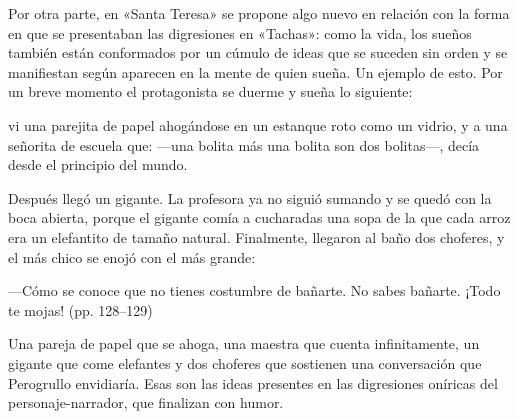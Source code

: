 \documentclass[14pt,twoside,final]{extbook} %
\begin{document}
Por otra parte, en «Santa Teresa» se propone algo nuevo en relación con la forma en que se presentaban las digresiones en «Tachas»: como la vida, los sueños también están conformados por un cúmulo de ideas que se suceden sin orden y se manifiestan según aparecen en la mente de quien sueña. Un ejemplo de esto. Por un breve momento el protagonista se duerme y sueña lo siguiente:
\begin{quoting}
vi una parejita de papel ahogándose en un estanque roto como un vidrio, y a una señorita de escuela que: ---una bolita más una bolita son dos bolitas---, decía desde el principio del mundo.

Después llegó un gigante. La profesora ya no siguió sumando y se quedó con la boca abierta, porque el gigante comía a cucharadas una sopa de la que cada arroz era un elefantito de tamaño natural. Finalmente, llegaron al baño dos choferes, y el más chico se enojó con el más grande:

---Cómo se conoce que no tienes costumbre de bañarte. No sabes bañarte. ¡Todo te mojas! (pp. 128--129)
\end{quoting}
Una pareja de papel que se ahoga, una maestra que cuenta infinitamente, un gigante que come elefantes y dos choferes que sostienen una conversación que Perogrullo envidiaría. Esas son las ideas presentes en las digresiones oníricas del personaje-narrador, que finalizan con humor.
\end{document}
